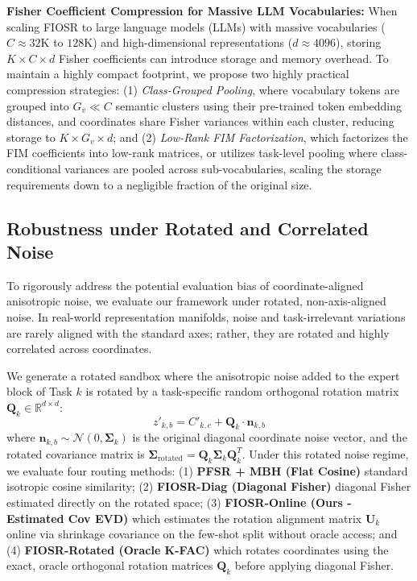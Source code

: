 \textbf{Fisher Coefficient Compression for Massive LLM Vocabularies:}
When scaling FIOSR to large language models (LLMs) with massive vocabularies ($C \approx 32\text{K}$ to $128\text{K}$) and high-dimensional representations ($d \approx 4096$), storing $K \times C \times d$ Fisher coefficients can introduce storage and memory overhead. To maintain a highly compact footprint, we propose two highly practical compression strategies: (1) \emph{Class-Grouped Pooling}, where vocabulary tokens are grouped into $G_v \ll C$ semantic clusters using their pre-trained token embedding distances, and coordinates share Fisher variances within each cluster, reducing storage to $K \times G_v \times d$; and (2) \emph{Low-Rank FIM Factorization}, which factorizes the FIM coefficients into low-rank matrices, or utilizes task-level pooling where class-conditional variances are pooled across sub-vocabularies, scaling the storage requirements down to a negligible fraction of the original size.

\subsection{Robustness under Rotated and Correlated Noise}
\label{sec:rotated_noise_exp}

To rigorously address the potential evaluation bias of coordinate-aligned anisotropic noise, we evaluate our framework under rotated, non-axis-aligned noise. In real-world representation manifolds, noise and task-irrelevant variations are rarely aligned with the standard axes; rather, they are rotated and highly correlated across coordinates. 

We generate a rotated sandbox where the anisotropic noise added to the expert block of Task $k$ is rotated by a task-specific random orthogonal rotation matrix $\mathbf{Q}_k \in \mathbb{R}^{d \times d}$:
\begin{equation}
z'_{k, b} = C'_{k, c} + \mathbf{Q}_k \cdot \mathbf{n}_{k, b}
\end{equation}
where $\mathbf{n}_{k, b} \sim \mathcal{N}(0, \mathbf{\Sigma}_{k})$ is the original diagonal coordinate noise vector, and the rotated covariance matrix is $\mathbf{\Sigma}_{\text{rotated}} = \mathbf{Q}_k \mathbf{\Sigma}_k \mathbf{Q}_k^T$. Under this rotated noise regime, we evaluate four routing methods: (1) \textbf{PFSR + MBH (Flat Cosine)} standard isotropic cosine similarity; (2) \textbf{FIOSR-Diag (Diagonal Fisher)} diagonal Fisher estimated directly on the rotated space; (3) \textbf{FIOSR-Online (Ours - Estimated Cov EVD)} which estimates the rotation alignment matrix $\mathbf{U}_k$ online via shrinkage covariance on the few-shot split without oracle access; and (4) \textbf{FIOSR-Rotated (Oracle K-FAC)} which rotates coordinates using the exact, oracle orthogonal rotation matrices $\mathbf{Q}_k$ before applying diagonal Fisher.

